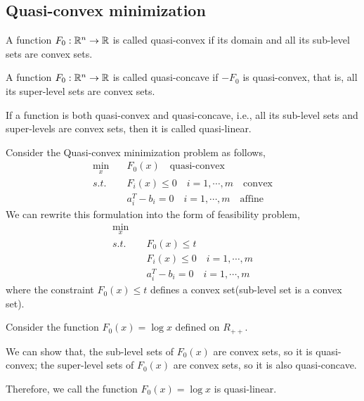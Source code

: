 \subsection{Quasi-convex minimization}
\begin{definition}
A function $F_0: \mathbb{R}^n\to\mathbb{R}$ is called quasi-convex if its domain and all
its sub-level sets are convex sets. 
\end{definition}

\begin{definition}
A function $F_0: \mathbb{R}^n\to\mathbb{R}$ is called quasi-concave if $-F_0$ is quasi-convex, that is, all its super-level sets are convex sets.
\end{definition}

\begin{definition}
If a function is both quasi-convex and quasi-concave, i.e., all its sub-level sets and super-levels are convex sets, then it is called quasi-linear.
\end{definition}

Consider the Quasi-convex minimization problem as follows,
\begin{align*}
\min_x\quad & F_0(x) \quad \text{quasi-convex}\\
s.t.\quad & F_i(x) \leq 0 \quad i = 1,\cdots,m\quad \text{convex}\\
& a_i^T - b_i = 0\quad i = 1,\cdots,m \quad \text{affine}
\end{align*}
We can rewrite this formulation into the form of feasibility problem,
\begin{align*}
\min_x\quad & \\%
s.t.\quad  & F_0(x) \leq t  \\
& F_i(x) \leq 0 \quad i = 1,\cdots,m \\
& a_i^T - b_i = 0\quad i = 1,\cdots,m
\end{align*}
where the constraint $F_0(x) \leq t$ defines a convex set(sub-level set is a convex set).

\begin{example}
	Consider the function $F_0(x) = \log x$ defined on $R_{++}$.
	
	We can show that, the sub-level sets of $F_0(x)$ are convex sets, so it is quasi-convex; the super-level sets of $F_0(x)$ are convex sets, so it is also quasi-concave. 
	
	Therefore, we call the function $F_0(x) = \log x$ is quasi-linear.
\end{example}



